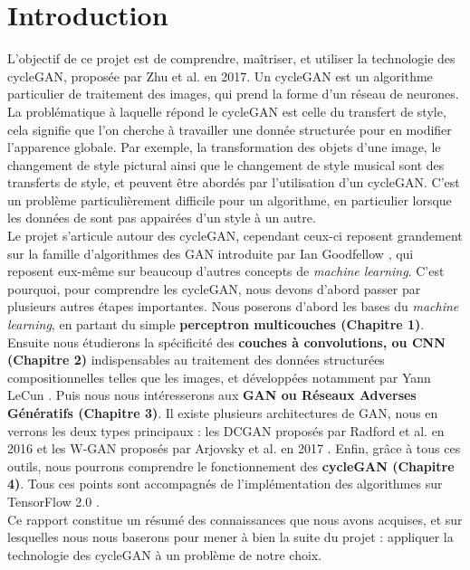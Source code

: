 \chapter*{Introduction}


L'objectif de ce projet est de comprendre, maîtriser, et utiliser la technologie des cycleGAN, proposée par Zhu et al. \cite{zhu_unpaired_2018} en 2017. Un cycleGAN est un algorithme particulier de traitement des images, qui prend la forme d'un réseau de neurones. La problématique à laquelle répond le cycleGAN est celle du transfert de style, cela signifie que l'on cherche à travailler une donnée structurée pour en modifier l’apparence globale. Par exemple, la transformation des objets d'une image, le changement de style pictural ainsi que le changement de style musical sont des transferts de style, et peuvent être abordés par l'utilisation d'un cycleGAN. C'est un problème particulièrement difficile pour un algorithme, en particulier lorsque les données de sont pas appairées d'un style à un autre.\\

Le projet s'articule autour des cycleGAN, cependant ceux-ci reposent grandement sur la famille d'algorithmes des GAN introduite par Ian Goodfellow \cite{goodfellow_generative_2014-1}, qui reposent eux-même sur beaucoup d'autres concepts de \textit{machine learning}. C'est pourquoi, pour comprendre les cycleGAN, nous devons d'abord passer par plusieurs autres étapes importantes. Nous poserons d'abord les bases du \textit{machine learning}, en partant du simple \textbf{perceptron multicouches (Chapitre 1)}. Ensuite nous étudierons la spécificité des \textbf{couches à convolutions, ou 
CNN (Chapitre 2)} indispensables au traitement des données structurées compositionnelles telles que les images, et développées notamment par Yann LeCun \cite{lecun_gradient-based_1998}. Puis nous nous intéresserons aux \textbf{GAN ou Réseaux Adverses Génératifs (Chapitre 3)}. Il existe plusieurs architectures de GAN, nous en verrons les deux types principaux : les DCGAN proposés par Radford et al. en 2016 \cite{radford_unsupervised_2016} et les W-GAN proposés par Arjovsky et al. en 2017 \cite{arjovsky_wasserstein_2017}. Enfin, grâce à tous ces outils, nous pourrons comprendre le fonctionnement des \textbf{cycleGAN (Chapitre 4)}. Tous ces points sont accompagnés de l'implémentation des algorithmes sur TensorFlow 2.0 \cite{goldsborough_tour_2016}.\\

Ce rapport constitue un résumé des connaissances que nous avons acquises, et sur lesquelles nous nous baserons pour mener à bien la suite du projet : appliquer la technologie des cycleGAN à un problème de notre choix.
